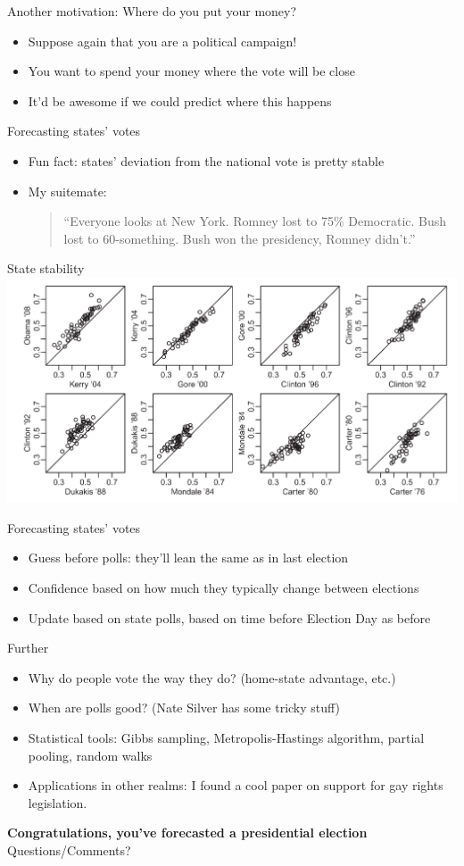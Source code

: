 \documentclass[14pt]{beamer}
\newcommand{\bi}{\begin{itemize}}
\newcommand{\ei}{\end{itemize}}
\begin{document}
\begin{frame}[t]{Another motivation: Where do you put your money?}
\bi
\item Suppose again that you are a political campaign!
\item You want to spend your money where the vote will be close
\item It'd be awesome if we could predict where this happens
\ei
\end{frame}

\begin{frame}[t]{Forecasting states' votes}
\bi
\item Fun fact: states' deviation from the national vote is pretty stable
\item My suitemate:

\begin{quote}``Everyone looks at New York. Romney lost to 75\% Democratic. Bush lost to 60-something. Bush won the presidency, Romney didn't.''\end{quote}
\ei
\end{frame}

\begin{frame}{State stability}
\includegraphics[width=\textwidth]{statestability.png}
\end{frame}

\begin{frame}[t]{Forecasting states' votes}
\bi
\item Guess before polls: they'll lean the same as in last election
\item Confidence based on how much they typically change between elections
\item Update based on state polls, based on time before Election Day as before
\ei
\end{frame}

\begin{frame}[t]{Further}
\bi
\item Why do people vote the way they do? (home-state advantage, etc.)
\item When are polls good? (Nate Silver has some tricky stuff)
\item Statistical tools: Gibbs sampling, Metropolis-Hastings algorithm, partial pooling, random walks
\item Applications in other realms: I found a cool paper on support for gay rights legislation.
\ei
\end{frame}

\begin{frame}
\begin{center}
{\Large\textbf{Congratulations, you've forecasted a presidential election}} \\[2em] Questions/Comments?
\end{center}
\end{frame}
\end{document}
